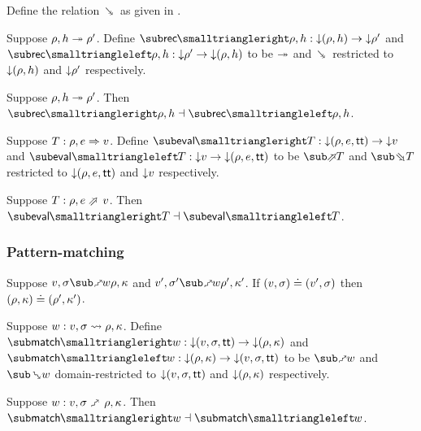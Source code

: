 \begin{definition}
   \label{def:core-language:closeDefs-bwd}
   Define the relation $\closeDefsBwdR$ as given in .
\end{definition}

\begin{definition}
   Suppose $\rho, h \twoheadrightarrow \rho'$. Define $\closeDefsFwdF{\rho,h}: \Below{(\rho, h)} \to \Below{\rho'}$ and $\closeDefsBwdF{\rho,h}: \Below{\rho'} \to \Below{(\rho, h)}$ to be $\twoheadrightarrow$ and $\closeDefsBwdR$ restricted to ${\downarrow}{(\rho, h)}$ and ${\downarrow}{\rho'}$ respectively.
\end{definition}

\begin{theorem}
\label{thm:core-language:closeDefs:gc}
   Suppose $\rho, h \twoheadrightarrow \rho'$.  Then $\closeDefsFwdF{\rho,h} \adjoint \closeDefsBwdF{\rho,h}$.
\end{theorem}

\begin{definition}
   Suppose $T: \rho, e \Rightarrow v$. Define $\evalFwdF{T}: \Below{(\rho, e, \TT)} \to \Below{v}$ and $\evalBwdF{T}: \Below{v} \to \Below{(\rho, e, \TT)}$ to be $\evalFwdR{T}$ and $\evalBwdR{T}$ restricted to ${\downarrow}{(\rho, e, \mathsf{tt})}$ and ${\downarrow}{v}$ respectively.
\end{definition}

\begin{theorem}
\label{thm:core-language:eval:gc}
   Suppose $T: \rho, e \evalFwdS v$.  Then $\evalFwdF{T} \adjoint \evalBwdF{T}$.
\end{theorem}

\subsubsection{Pattern-matching}



\begin{lemma}
   Suppose $v, \sigma \matchFwdR{w} \rho, \kappa$ and $v', \sigma' \matchFwdR{w} \rho', \kappa'$. If $(v, \sigma) \doteq (v', \sigma)$ then $(\rho, \kappa) \doteq (\rho', \kappa')$.
\end{lemma}

\begin{definition}
   Suppose $w: v, \sigma \rightsquigarrow \rho, \kappa$. Define $\matchFwdF{w}: \Below{(v,\sigma,\TT)} \to \Below{(\rho,\kappa)}$ and $\matchBwdF{w}: \Below{(\rho,\kappa)} \to \Below{(v,\sigma,\TT)}$ to be $\matchFwdR{w}$ and $\matchBwdR{w}$ domain-restricted to ${\downarrow}{(v,\sigma,\mathsf{tt})}$ and ${\downarrow}{(\rho,\kappa)}$ respectively.
\end{definition}

\begin{theorem}
\label{thm:core-language:match:gc}
   Suppose $w: v, \sigma \matchFwdS \rho, \kappa$.  Then $\matchFwdF{w} \adjoint \matchBwdF{w}$.
\end{theorem}
